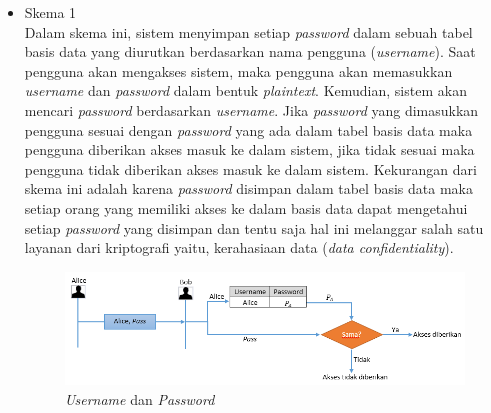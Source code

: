 \begin{itemize}
	\item Skema 1\\
	Dalam skema ini, sistem menyimpan setiap \textit{password} dalam sebuah tabel basis data yang diurutkan berdasarkan nama pengguna (\textit{username}). Saat pengguna akan mengakses sistem, maka pengguna akan memasukkan \textit{username} dan \textit{password} dalam bentuk \textit{plaintext}. Kemudian, sistem akan mencari \textit{password} berdasarkan \textit{username}. Jika \textit{password} yang dimasukkan pengguna sesuai dengan \textit{password} yang ada dalam tabel basis data maka pengguna diberikan akses masuk ke dalam sistem, jika tidak sesuai maka pengguna tidak diberikan akses masuk ke dalam sistem. Kekurangan dari skema ini adalah karena \textit{password} disimpan dalam tabel basis data maka setiap orang yang memiliki akses ke dalam basis data dapat mengetahui setiap \textit{password} yang disimpan dan tentu saja hal ini melanggar salah satu layanan dari kriptografi yaitu, kerahasiaan data (\textit{data confidentiality}).
	\begin{figure}[ht]
		\includegraphics[scale=0.7]{Gambar/password_1}
		\centering
		\caption{\textit{Username} dan \textit{Password}}
	\end{figure}
	

\end{itemize}
